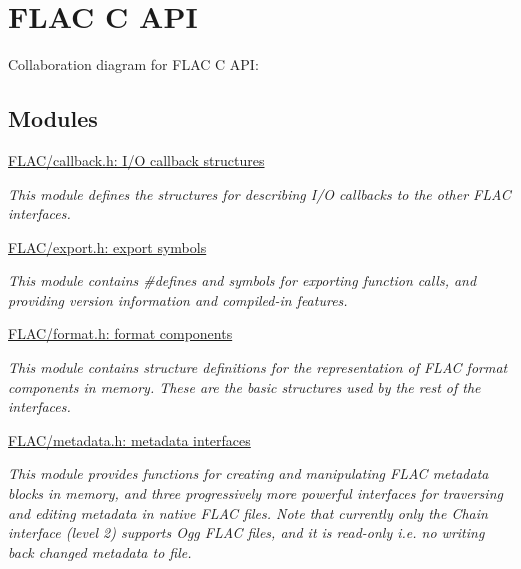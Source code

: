 \hypertarget{group__flac}{}\section{F\+L\+AC C A\+PI}
\label{group__flac}
Collaboration diagram for F\+L\+AC C A\+PI\+:
\subsection*{Modules}
\begin{DoxyCompactItemize}
\item 
\hyperlink{group__flac__callbacks}{F\+L\+A\+C/callback.\+h\+: I/\+O callback structures}
\begin{DoxyCompactList}\small\item\em This module defines the structures for describing I/O callbacks to the other F\+L\+AC interfaces. \end{DoxyCompactList}\item 
\hyperlink{group__flac__export}{F\+L\+A\+C/export.\+h\+: export symbols}
\begin{DoxyCompactList}\small\item\em This module contains \#defines and symbols for exporting function calls, and providing version information and compiled-\/in features. \end{DoxyCompactList}\item 
\hyperlink{group__flac__format}{F\+L\+A\+C/format.\+h\+: format components}
\begin{DoxyCompactList}\small\item\em This module contains structure definitions for the representation of F\+L\+AC format components in memory. These are the basic structures used by the rest of the interfaces. \end{DoxyCompactList}\item 
\hyperlink{group__flac__metadata}{F\+L\+A\+C/metadata.\+h\+: metadata interfaces}
\begin{DoxyCompactList}\small\item\em This module provides functions for creating and manipulating F\+L\+AC metadata blocks in memory, and three progressively more powerful interfaces for traversing and editing metadata in native F\+L\+AC files. Note that currently only the Chain interface (level 2) supports Ogg F\+L\+AC files, and it is read-\/only i.\+e. no writing back changed metadata to file. \end{DoxyCompactList}\item 

\end{DoxyCompactItemize}
